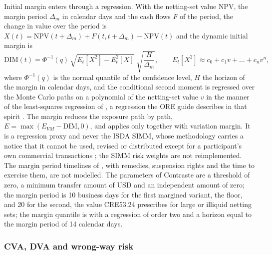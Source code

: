 Initial margin enters through a regression. With the netting-set value $\mathrm{NPV}$, the margin period $\Delta_m$ in calendar days and the cash flows $F$ of the period, the change in value over the period is $X(t)=\mathrm{NPV}(t+\Delta_m)+F(t,t+\Delta_m)-\mathrm{NPV}(t)$ and the dynamic initial margin is
\begin{equation}
\mathrm{DIM}(t)=\Phi^{-1}(q)\,\sqrt{E_t[X^2]-E_t^2[X]}\;\sqrt{\frac{H}{\Delta_m}},\qquad E_t[X^2]\approx c_0+c_1v+\dots+c_nv^n,
\label{eq:ccr-dim}
\end{equation}
where $\Phi^{-1}(q)$ is the normal quantile of the confidence level, $H$ the horizon of the margin in calendar days, and the conditional second moment is regressed over the Monte Carlo paths on a polynomial of the netting-set value $v$ in the manner of the least-squares regression of \citet{ccr:longstaff2001}, a regression the ORE guide
describes in that spirit \citep{ccr:ore}. The margin reduces the exposure path by path, $E=\max(E_{VM}-\mathrm{DIM},0)$, and applies only together with variation margin. It is a regression proxy and never the ISDA SIMM, whose methodology carries a notice that it cannot be used, revised or
distributed except for a participant's own commercial transactions \citep{ccr:simm}; the SIMM risk weights are not reimplemented. The margin period timelines of \citet{ccr:andersen2017}, with remedies, suspension rights and the time to exercise them, are not modelled. The parameters of Contraste are a threshold of zero, a minimum transfer amount of \ccrMta{} USD
and an independent amount of zero; the margin period is 10 business days for the first margined variant, the floor, and 20 for the second, the value CRE53.24 prescribes for large or illiquid netting sets; the margin quantile is \ccrImQuantile{} with a regression of order two and a horizon equal to the margin period of 14 calendar days.

\subsubsection{CVA, DVA and wrong-way risk}

